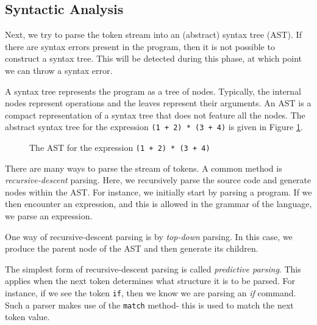 \subsection{Syntactic Analysis}
Next, we try to parse the token stream into an (abstract) syntax tree (AST). If there are syntax errors present in the program, then it is not possible to construct a syntax tree. This will be detected during this phase, at which point we can throw a syntax error.

A syntax tree represents the program as a tree of nodes. Typically, the internal nodes represent operations and the leaves represent their arguments. An AST is a compact representation of a syntax tree that does not feature all the nodes. The abstract syntax tree for the expression \texttt{(1 + 2) * (3 + 4)} is given in Figure \ref{fig:AST_example}.

\begin{figure}[htb]
    \centering
    \caption{The AST for the expression \texttt{(1 + 2) * (3 + 4)}}
    \label{fig:AST_example}
\end{figure}

There are many ways to parse the stream of tokens. A common method is \emph{recursive-descent} parsing. Here, we recursively parse the source code and generate nodes within the AST. For instance, we initially start by parsing a program. If we then encounter an expression, and this is allowed in the grammar of the language, we parse an expression. 

One way of recursive-descent parsing is by \emph{top-down} parsing. In this case, we produce the parent node of the AST and then generate its children. 

The simplest form of recursive-descent parsing is called \emph{predictive parsing}. This applies when the next token determines what structure it is to be parsed. For instance, if we see the token \texttt{if}, then we know we are parsing an \textit{if} command. Such a parser makes use of the \texttt{match} method- this is used to match the next token value.

